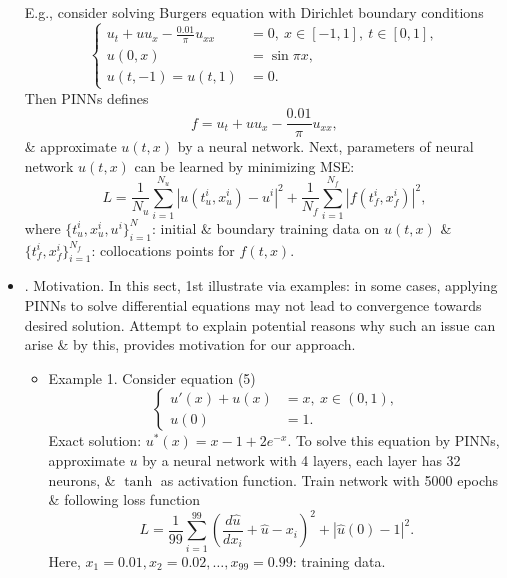 \documentclass{article}
\begin{document}
\begin{itemize}
	E.g., consider solving Burgers equation with Dirichlet boundary conditions
	\begin{equation*}
		\left\{\begin{split}
			u_t + uu_x - \frac{0.01}{\pi}u_{xx} &= 0,\ x\in[-1,1],\ t\in[0,1],\\
			u(0,x) &= \sin\pi x,\\
			u(t,-1) = u(t,1) &= 0.
		\end{split}\right.
	\end{equation*}
	Then PINNs defines
	\begin{equation*}
		f = u_t + uu_x - \frac{0.01}{\pi}u_{xx},
	\end{equation*}
	\& approximate $u(t,x)$ by a neural network. Next, parameters of neural network $u(t,x)$ can be learned by minimizing MSE:
	\begin{equation*}
		L = \frac{1}{N_u}\sum_{i=1}^{N_u} |u(t_u^i,x_u^i) - u^i|^2 + \frac{1}{N_f}\sum_{i=1}^{N_f} |f(t_f^i,x_f^i)|^2,
	\end{equation*}
	where $\{t_u^i,x_u^i,u^i\}_{i=1}^N$: initial \& boundary training data on $u(t,x)$ \& $\{t_f^i,x_f^i\}_{i=1}^{N_f}$: collocations points for $f(t,x)$.
	\item {. Motivation.} In this sect, 1st illustrate via examples: in some cases, applying PINNs to solve differential equations may not lead to convergence towards desired solution. Attempt to explain potential reasons why such an issue can arise \& by this, provides motivation for our approach.
	\begin{itemize}
		\item {\sf Example 1.} Consider equation (5)
		\begin{equation*}
			\left\{\begin{split}
				u'(x) + u(x) &= x,\ x\in(0,1),\\
				u(0) &= 1.
			\end{split}\right.
		\end{equation*}
		Exact solution: $u^*(x) = x - 1 + 2e^{-x}$. To solve this equation by PINNs, approximate $u$ by a neural network with 4 layers, each layer has 32 neurons, \& $\tanh$ as activation function. Train network with 5000 epochs \& following loss function
		\begin{equation*}
			L = \frac{1}{99}\sum_{i=1}^{99} \left(\frac{d\hat{u}}{dx_i} + \hat{u} - x_i\right)^2 + |\hat{u}(0) - 1|^2.
		\end{equation*}
		Here, $x_1 = 0.01,x_2 = 0.02,\ldots,x_{99} = 0.99$: training data.


\end{itemize}
\end{itemize}
\end{document}
